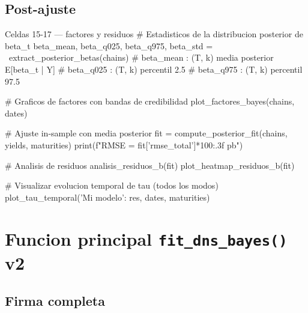 \documentclass[12pt, a4paper]{article}
\theoremstyle{plain}
\theoremstyle{definition}
\theoremstyle{remark}
\begin{document}
\subsection{Post-ajuste}

\begin{codigocaja}{Celdas 15-17 --- factores y residuos}
# Estadisticos de la distribucion posterior de beta_t
beta_mean, beta_q025, beta_q975, beta_std = \
    extract_posterior_betas(chains)
# beta_mean : (T, k)  media posterior E[beta_t | Y]
# beta_q025 : (T, k)  percentil 2.5%
# beta_q975 : (T, k)  percentil 97.5%

# Graficos de factores con bandas de credibilidad
plot_factores_bayes(chains, dates)

# Ajuste in-sample con media posterior
fit = compute_posterior_fit(chains, yields, maturities)
print(f"RMSE = {fit['rmse_total']*100:.3f} pb")

# Analisis de residuos
analisis_residuos_b(fit)
plot_heatmap_residuos_b(fit)

# Visualizar evolucion temporal de tau (todos los modos)
plot_tau_temporal({'Mi modelo': res}, dates, maturities)
\end{codigocaja}

\section{Funcion principal \texttt{fit\_dns\_bayes()} v2}

\subsection{Firma completa}
\end{document}
